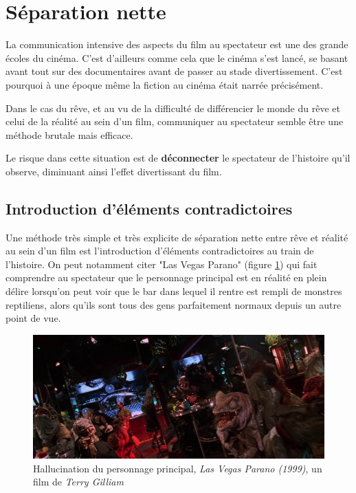 \documentclass[../main.tex]{subfile}
\begin{document}
\section{Séparation nette}

La communication intensive des aspects du film au spectateur est une des grande
écoles du cinéma. C'est d'ailleurs comme cela que le cinéma s'est lancé, se
basant avant tout sur des documentaires avant de passer au stade
divertissement. C'est pourquoi à une époque même la fiction au cinéma était
narrée précisément.

Dans le cas du rêve, et au vu de la difficulté de différencier le monde du rêve
et celui de la réalité au sein d'un film, communiquer au spectateur semble être
une méthode brutale mais efficace.

Le risque dans cette situation est de \textbf{déconnecter} le spectateur de
l'histoire qu'il observe, diminuant ainsi l'effet divertissant du film.

\subsection{Introduction d'éléments contradictoires}

Une méthode très simple et très explicite de séparation nette entre rêve et
réalité au sein d'un film est l'introduction d'éléments contradictoires au
train de l'histoire. On peut notamment citer "Las Vegas Parano" (figure
\ref{fig:images_lasvegas}) qui fait comprendre au spectateur que le personnage
principal est en réalité en plein délire lorsqu'on peut voir que le bar dans
lequel il rentre est rempli de monstres reptiliens, alors qu'ils sont tous des
gens parfaitement normaux depuis un autre point de vue.

\begin{figure}
    \centering
    \includegraphics[width=\linewidth]{images/lasvegas}
    \caption{Hallucination du personnage principal, \textit{Las Vegas Parano (1999)}, un film de
             \textit{Terry Gilliam}}
    \label{fig:images_lasvegas}
\end{figure}
\end{document}
